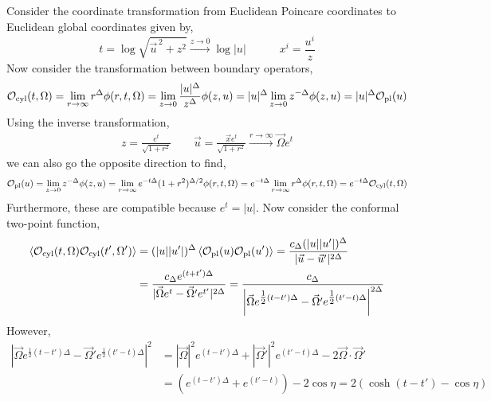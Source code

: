 \documentclass[12pt]{article}
\begin{document}
\subsection{}

Consider the coordinate transformation from Euclidean Poincare coordinates to Euclidean global coordinates given by,
\[ t = \log{\sqrt{\vec{u}^{\, 2} + z^2}} \xrightarrow{z \to 0} \log{|u|} \quad \quad \quad x^i = \frac{u^i}{z} \]
Now consider the transformation between boundary operators,
\begin{align*}
\mathcal{O}_{\text{cyl}}(t, \Omega) = \lim_{r \to \infty} r^{\Delta} \phi(r, t, \Omega) = \lim_{z \to 0} \frac{|u|^\Delta}{z^\Delta} \phi(z, u) = |u|^{\Delta} \lim_{z \to 0} z^{-\Delta} \phi(z, u) = |u|^{\Delta} \mathcal{O}_{\text{pl}}(u)
\end{align*} 
Using the inverse transformation,
\begin{align*}
z = \frac{e^{t}}{\sqrt{1 + r^2}} \quad \quad \vec{u} = \frac{\vec{x} e^t}{\sqrt{1 + r^2}} \xrightarrow{r \to \infty} \vec{\Omega} e^t 
\end{align*}
we can also go the opposite direction to find,
\begin{align*}
\mathcal{O}_{\text{pl}}(u) = \lim_{z \to 0} z^{-\Delta} \phi(z, u) = \lim_{r \to \infty} e^{-t \Delta} (1 + r^2)^{\Delta / 2} \phi(r, t, \Omega) = e^{-t \Delta} \lim_{r \to \infty}  r^{\Delta} \phi(r, t, \Omega) = e^{- t \Delta} \mathcal{O}_{\text{cyl}}(t, \Omega)
\end{align*}
Furthermore, these are compatible because $e^t = |u|$. Now consider the conformal two-point function,
\begin{align*}
\left< \mathcal{O}_{\text{cyl}}(t, \Omega) \mathcal{O}_{\text{cyl}}(t', \Omega') \right> & = (|u| |u'|)^{\Delta} \left< \mathcal{O}_{\text{pl}}(u) \mathcal{O}_{\text{pl}}(u') \right> = \frac{c_\Delta (|u| |u'|)^{\Delta}}{|\vec{u} - \vec{u}'|^{2\Delta}}
\\
& = \frac{c_\Delta e^{(t + t') \Delta}}{|\vec{\Omega} e^t - \vec{\Omega}' e^{t'}|^{2\Delta}} = \frac{c_{\Delta}}{\left|\vec{\Omega} e^{\tfrac{1}{2}(t - t') \Delta} - \vec{\Omega}' e^{\tfrac{1}{2}(t' - t) \Delta} \right|^{2 \Delta}}
\end{align*}
However,
\begin{align*}
\left|\vec{\Omega} e^{\tfrac{1}{2}(t - t') \Delta} - \vec{\Omega}' e^{\tfrac{1}{2}(t' - t) \Delta} \right|^2 & = |\vec{\Omega}|^2 e^{(t - t')\Delta} + |\vec{\Omega}'|^2 e^{(t' - t)\Delta} - 2 \vec{\Omega} \cdot \vec{\Omega}'
\\
& = (e^{(t - t') \Delta} + e^{(t' - t)}) - 2 \cos{\eta} = 2 \left( \cosh{(t - t')} - \cos{\eta} \right)
\end{align*}
\end{document}
